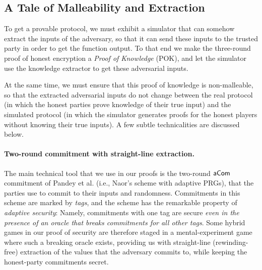 \subsection{A Tale of Malleability and Extraction}
To get a provable protocol, we must exhibit a simulator that can somehow extract the inputs of the adversary, so that it can send these inputs to the trusted party in order to get the function output. To that end we make the three-round proof of honest encryption a \emph{Proof of Knowledge} (POK), and let the simulator use the knowledge extractor to get these adversarial inputs.

At the same time, we must ensure that this proof of knowledge is non-malleable, so that the extracted adversarial inputs do not change between the real protocol (in which the honest parties prove knowledge of their true input) and the simulated protocol (in which the simulator generates proofs for the honest players without knowing their true inputs).
A few subtle technicalities are discussed below.

\paragraph{Two-round commitment with straight-line extraction.}
The main technical tool that we use in our proofs is the two-round $\mathsf{aCom}$ commitment of Pandey et al. \cite{C:PanPasVai08} (i.e., Naor's scheme \cite{JC:Naor91} with adaptive PRGs), that the parties use to commit to their inputs and randomness. Commitments in this scheme are marked by \emph{tags}, and the scheme has the remarkable property of \emph{adaptive security}: Namely, commitments with one tag are secure \emph{even in the presence of an oracle that breaks commitments for all other tags}. 
Some hybrid games in our proof of security are therefore staged in a mental-experiment game where such a breaking oracle exists, providing us with straight-line (rewinding-free) extraction of the values that the adversary commits to, while keeping the honest-party commitments secret.

